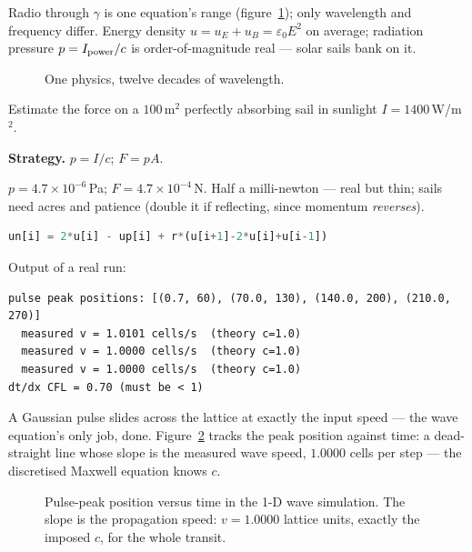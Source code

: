 Radio through $\gamma$ is one equation's range
(figure~\ref{fig:spectrum}); only wavelength and frequency differ.
Energy density $u=u_E+u_B=\varepsilon_0E^{2}$ on average; radiation
pressure $p=I_{\rm power}/c$ is order-of-magnitude real --- solar
sails bank on it.

\begin{figure}[htbp]\centering

\caption{One physics, twelve decades of wavelength.}
\label{fig:spectrum}
\end{figure}

\begin{example}\label{ex:sail}
Estimate the force on a $100$\,m$^{2}$ perfectly absorbing sail in
sunlight $I=1400$\,W/m$^{2}$.
\par\smallskip
\textbf{Strategy.} $p=I/c$; $F=pA$.
\begin{solution}
$p=4.7\times10^{-6}$\,Pa; $F=4.7\times10^{-4}$\,N. Half a
milli-newton --- real but thin; sails need acres and patience
(double it if reflecting, since momentum \emph{reverses}).
\checkmark
\end{solution}
\end{example}

\begin{lstlisting}[language=Python,caption={\texttt{code/ch15\_em\_pulse.py} --- 1-D wave integrator; honest lattice stand-in for Maxwell.},label={lst:pulse}]
un[i] = 2*u[i] - up[i] + r*(u[i+1]-2*u[i]+u[i-1])
\end{lstlisting}

Output of a real run:
\begin{lstlisting}[numbers=none]
pulse peak positions: [(0.7, 60), (70.0, 130), (140.0, 200), (210.0, 270)]
  measured v = 1.0101 cells/s  (theory c=1.0)
  measured v = 1.0000 cells/s  (theory c=1.0)
  measured v = 1.0000 cells/s  (theory c=1.0)
dt/dx CFL = 0.70 (must be < 1)
\end{lstlisting}

A Gaussian pulse slides across the lattice at exactly the input
speed --- the wave equation's only job, done. Figure~\ref{fig:pulseloc}
tracks the peak position against time: a dead-straight line whose slope
is the measured wave speed, $1.0000$ cells per step --- the discretised
Maxwell equation knows $c$.

\begin{figure}[htbp]\centering

\caption{Pulse-peak position versus time in the 1-D wave simulation.
The slope is the propagation speed: $v=1.0000$ lattice units, exactly
the imposed $c$, for the whole transit.}
\label{fig:pulseloc}
\end{figure}

